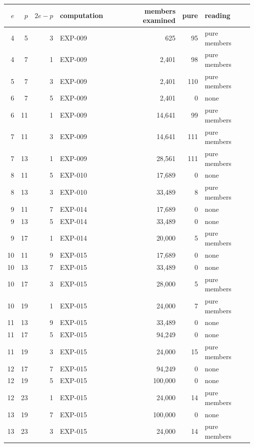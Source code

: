 \begin{tabular}{@{}rrrlrrl@{}}
\toprule
$e$ & $p$ & $2e-p$ & computation & members examined & pure & reading\\
\midrule
4 & 5 & 3 & EXP-009 & 625 & 95 & pure members\\
4 & 7 & 1 & EXP-009 & 2{,}401 & 98 & pure members\\
5 & 7 & 3 & EXP-009 & 2{,}401 & 110 & pure members\\
6 & 7 & 5 & EXP-009 & 2{,}401 & 0 & none\\
6 & 11 & 1 & EXP-009 & 14{,}641 & 99 & pure members\\
7 & 11 & 3 & EXP-009 & 14{,}641 & 111 & pure members\\
7 & 13 & 1 & EXP-009 & 28{,}561 & 111 & pure members\\
8 & 11 & 5 & EXP-010 & 17{,}689 & 0 & none\\
8 & 13 & 3 & EXP-010 & 33{,}489 & 8 & pure members\\
9 & 11 & 7 & EXP-014 & 17{,}689 & 0 & none\\
9 & 13 & 5 & EXP-014 & 33{,}489 & 0 & none\\
9 & 17 & 1 & EXP-014 & 20{,}000 & 5 & pure members\\
10 & 11 & 9 & EXP-015 & 17{,}689 & 0 & none\\
10 & 13 & 7 & EXP-015 & 33{,}489 & 0 & none\\
10 & 17 & 3 & EXP-015 & 28{,}000 & 5 & pure members\\
10 & 19 & 1 & EXP-015 & 24{,}000 & 7 & pure members\\
11 & 13 & 9 & EXP-015 & 33{,}489 & 0 & none\\
11 & 17 & 5 & EXP-015 & 94{,}249 & 0 & none\\
11 & 19 & 3 & EXP-015 & 24{,}000 & 15 & pure members\\
12 & 17 & 7 & EXP-015 & 94{,}249 & 0 & none\\
12 & 19 & 5 & EXP-015 & 100{,}000 & 0 & none\\
12 & 23 & 1 & EXP-015 & 24{,}000 & 14 & pure members\\
13 & 19 & 7 & EXP-015 & 100{,}000 & 0 & none\\
13 & 23 & 3 & EXP-015 & 24{,}000 & 14 & pure members\\
\bottomrule
\end{tabular}
